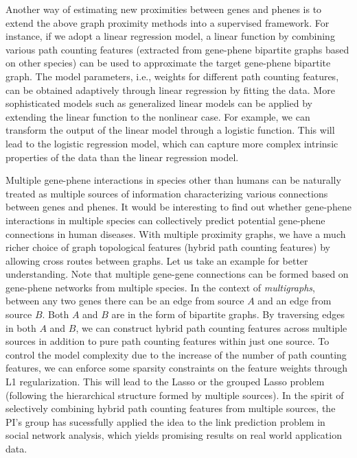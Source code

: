 Another way of estimating new proximities between genes and phenes is to extend the above graph proximity methods into a supervised framework. For instance, if we adopt a linear regression model, a linear function by combining various path counting features (extracted from gene-phene bipartite graphs based on other species) can be used to approximate the target gene-phene bipartite graph. The model parameters, i.e., weights for different path counting features, can be obtained adaptively through linear regression by fitting the data. More sophisticated models such as generalized linear models can be applied by extending the linear function to the nonlinear case. For example, we can transform the output of the linear model through a logistic function. This will lead to the logistic regression model, which can capture more complex intrinsic properties of the data than the linear regression model. 

Multiple gene-phene interactions in species other than humans can be naturally treated as multiple sources of information characterizing various connections between genes and phenes. It would be interesting to find out whether gene-phene interactions in multiple species can collectively predict potential gene-phene connections in human diseases. With multiple proximity graphs, we have a much richer choice of graph topological features (hybrid path counting features) by allowing cross routes between graphs. Let us take an example for better understanding. Note that multiple gene-gene connections can be formed based on gene-phene networks from multiple species. In the context of \emph{multigraphs}\cite{harary94}, between any two genes there can be an edge from source $A$ and an edge from source $B$. Both $A$ and $B$ are in the form of bipartite graphs. By traversing edges in both $A$ and $B$, we can construct hybrid path counting features across multiple sources in addition to pure path counting features within just one source. To control the model complexity due to the increase of the number of path counting features, we can enforce some sparsity constraints on the feature weights through L1 regularization\cite{lasso}. This will lead to the Lasso or the grouped Lasso problem (following the hierarchical structure formed by multiple sources)\cite{jenatton09,bach08,zhao09}. In the spirit of selectively combining hybrid path counting features from multiple sources, the PI's group has sucessfully applied the idea to the link prediction problem in social network analysis, which yields promising results on real world application data\cite{berkantSupervised}.  
